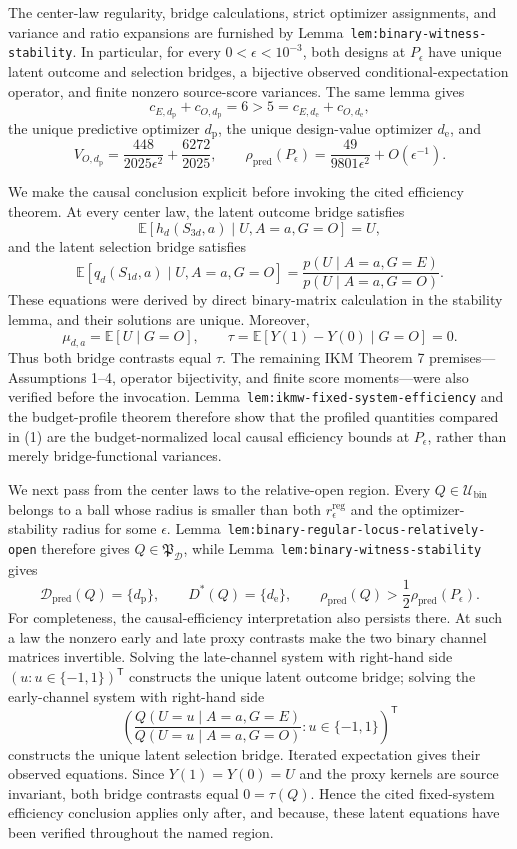 The center-law regularity, bridge calculations, strict optimizer assignments, and variance and ratio expansions are furnished by Lemma~\texttt{lem:binary-witness-stability}.  In particular, for every \(0<\epsilon<10^{-3}\), both designs at \(P_\epsilon\) have unique latent outcome and selection bridges, a bijective observed conditional-expectation operator, and finite nonzero source-score variances.  The same lemma gives
\[
 c_{E,d_{\mathrm p}}+c_{O,d_{\mathrm p}}=6>5
 =c_{E,d_{\mathrm e}}+c_{O,d_{\mathrm e}},
\]
the unique predictive optimizer \(d_{\mathrm p}\), the unique design-value optimizer \(d_{\mathrm e}\), and
\[
 V_{O,d_{\mathrm p}}
 =\frac{448}{2025\epsilon^2}+\frac{6272}{2025},
 \qquad
 \rho_{\mathrm{pred}}(P_\epsilon)
 =\frac{49}{9801\epsilon^2}+O(\epsilon^{-1}). \tag{1}
\]

We make the causal conclusion explicit before invoking the cited efficiency theorem.  At every center law, the latent outcome bridge satisfies
\[
 \mathbb E[h_d(S_{3d},a)\mid U,A=a,G=O]=U,
\]
and the latent selection bridge satisfies
\[
 \mathbb E[q_d(S_{1d},a)\mid U,A=a,G=O]
 =\frac{p(U\mid A=a,G=E)}{p(U\mid A=a,G=O)}.
\]
These equations were derived by direct binary-matrix calculation in the stability lemma, and their solutions are unique.  Moreover,
\[
 \mu_{d,a}=\mathbb E[U\mid G=O],
 \qquad
 \tau=\mathbb E[Y(1)-Y(0)\mid G=O]=0. \tag{2}
\]
Thus both bridge contrasts equal \(\tau\).  The remaining IKM Theorem 7 premises---Assumptions 1--4, operator bijectivity, and finite score moments---were also verified before the invocation.  Lemma~\texttt{lem:ikmw-fixed-system-efficiency} and the budget-profile theorem therefore show that the profiled quantities compared in (1) are the budget-normalized local causal efficiency bounds at \(P_\epsilon\), rather than merely bridge-functional variances.

We next pass from the center laws to the relative-open region.  Every \(Q\in\mathcal U_{\mathrm{bin}}\) belongs to a ball whose radius is smaller than both \(r_\epsilon^{\mathrm{reg}}\) and the optimizer-stability radius for some \(\epsilon\).  Lemma~\texttt{lem:binary-regular-locus-relatively-open} therefore gives \(Q\in\mathfrak P_{\mathcal D}\), while Lemma~\texttt{lem:binary-witness-stability} gives
\[
 \mathcal D_{\mathrm{pred}}(Q)=\{d_{\mathrm p}\},
 \qquad
 D^*(Q)=\{d_{\mathrm e}\},
 \qquad
 \rho_{\mathrm{pred}}(Q)>\frac{1}{2}\rho_{\mathrm{pred}}(P_\epsilon). \tag{3}
\]
For completeness, the causal-efficiency interpretation also persists there.  At such a law the nonzero early and late proxy contrasts make the two binary channel matrices invertible.  Solving the late-channel system with right-hand side \((u:u\in\{-1,1\})^{\mathsf T}\) constructs the unique latent outcome bridge; solving the early-channel system with right-hand side
\[
 \left(
 \frac{Q(U=u\mid A=a,G=E)}{Q(U=u\mid A=a,G=O)}:
 u\in\{-1,1\}\right)^{\mathsf T}
\]
constructs the unique latent selection bridge.  Iterated expectation gives their observed equations.  Since \(Y(1)=Y(0)=U\) and the proxy kernels are source invariant, both bridge contrasts equal \(0=\tau(Q)\).  Hence the cited fixed-system efficiency conclusion applies only after, and because, these latent equations have been verified throughout the named region.

